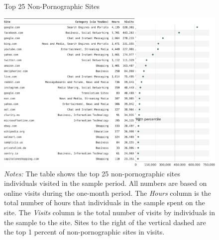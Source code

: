 \documentclass[12pt, letterpaper]{article}
\begin{document}
\begin{figure}
	\centering
	\caption{Top 25 Non-Pornographic Sites}
	\includegraphics[width=\textwidth]{figs/top_25_nonadultsites.pdf}
	\caption*{\footnotesize \emph{Notes:} 
		The table shows the top 25 non-pornographic sites individuals visited in the sample period.
            All numbers are based on online visits during the one-month period.
		The \emph{Hours} column is the total number of hours that individuals in the sample spent on the site. 
		The \emph{Visits} column is the total number of visits by individuals in the sample to the site.  			
		Sites to the right of the vertical dashed are the top 1 percent of non-pornographic sites in visits.
	}
	\label{fig:top25_nonadult}
\end{figure}
\end{document}
